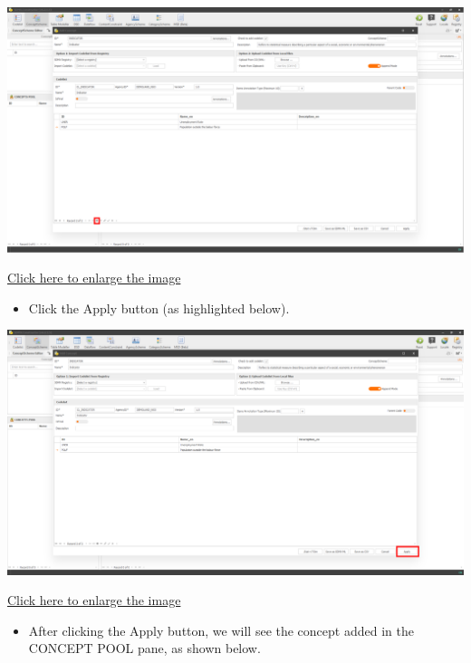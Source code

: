 \documentclass[
]{book}
\providecommand{\tightlist}{%
  \setlength{\itemsep}{0pt}\setlength{\parskip}{0pt}}
\begin{document}
\begin{center}\includegraphics[width=1\linewidth]{./images/image242} \end{center}

\href{images/image242.png}{Click here to enlarge the image}

\begin{itemize}
\tightlist
\item
  Click the Apply button (as highlighted below).
\end{itemize}

\begin{center}\includegraphics[width=1\linewidth]{./images/image243} \end{center}

\href{images/image243.png}{Click here to enlarge the image}

\begin{itemize}
\tightlist
\item
  After clicking the Apply button, we will see the concept added in the CONCEPT POOL pane, as shown below.
\end{itemize}
\end{document}
